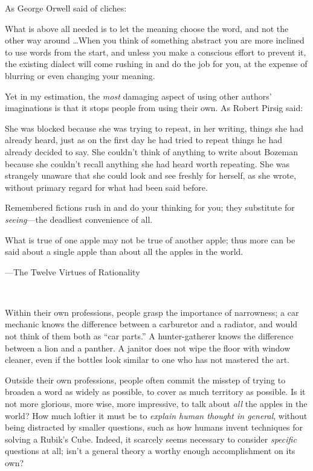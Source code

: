 {
 As George Orwell said of cliches:}

{
 What is above all needed is to let the meaning choose the word,
and not the other way around \ldots When you think of something abstract
you are more inclined to use words from the start, and unless you make
a conscious effort to prevent it, the existing dialect will come
rushing in and do the job for you, at the expense of blurring or even
changing your meaning.}

{
 Yet in my estimation, the \textit{most} damaging aspect of using
other authors' imaginations is that it stops people
from using their own. As Robert Pirsig said:}

{
 She was blocked because she was trying to repeat, in her writing,
things she had already heard, just as on the first day he had tried to
repeat things he had already decided to say. She
couldn't think of anything to write about Bozeman
because she couldn't recall anything she had heard
worth repeating. She was strangely unaware that she could look and see
freshly for herself, as she wrote, without primary regard for what had
been said before.}

{
 Remembered fictions rush in and do your thinking for you; they
substitute for \textit{seeing}{}---the deadliest convenience of all.}

\myendsectiontext


\bigskip


{
 What is true of one apple may not be true of another apple; thus
more can be said about a single apple than about all the apples in the
world.}

{\raggedleft
 {}---The Twelve Virtues of Rationality
\par}


\bigskip

{
 ~}

{
 Within their own professions, people grasp the importance of
narrowness; a car mechanic knows the difference between a carburetor
and a radiator, and would not think of them both as
``car parts.'' A hunter-gatherer
knows the difference between a lion and a panther. A janitor does not
wipe the floor with window cleaner, even if the bottles look similar to
one who has not mastered the art.}

{
 Outside their own professions, people often commit the misstep of
trying to broaden a word as widely as possible, to cover as much
territory as possible. Is it not more glorious, more wise, more
impressive, to talk about \textit{all} the apples in the world? How
much loftier it must be to \textit{explain human thought in general},
without being distracted by smaller questions, such as how humans
invent techniques for solving a Rubik's Cube. Indeed,
it scarcely seems necessary to consider \textit{specific} questions at
all; isn't a general theory a worthy enough
accomplishment on its own?}

